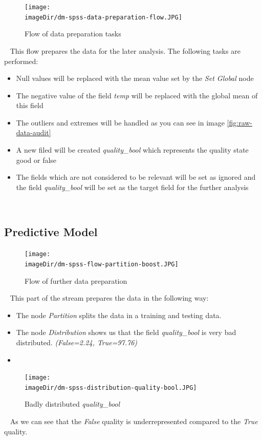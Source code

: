\documentclass[11pt, a4paper, twoside]{article}   	%
\newcommand{\imageDir}{./images/}
\begin{document}
\begin{figure}[h]
\centering
\texttt{[image: \\imageDir/dm-spss-data-preparation-flow.JPG]}
\caption{Flow of data preparation tasks}
\end{figure}
\ \newline
This flow prepares the data for the later analysis. The following tasks are performed:
\begin{itemize}
	\item Null values will be replaced with the mean value set by the \emph{Set Global} node
	\item The negative value of the field \emph{temp} will be replaced with the global mean of this field
	\item The outliers and extremes will be handled as you can see in image \ref{fig:raw-data-audit}
	\item A new filed will be created \emph{quality\_bool} which represents the quality state good or false
	\item The fields which are not considered to be relevant will be set as ignored and the field \emph{quality\_bool} will be set as the target field for the further analysis
\end{itemize}
\ \newpage

\subsection{Predictive Model}
\begin{figure}[h]
\centering
\texttt{[image: \\imageDir/dm-spss-flow-partition-boost.JPG]}
\caption{Flow of further data preparation}
\end{figure}
\ \newline
This part of the stream prepares the data in the following way:
\begin{itemize}
	\item The node \emph{Partition} splits the data in a training and testing data.
	\item The node \emph{Distribution} shows us that the field \emph{quality\_bool} is very bad distributed. \emph{(False=2.24, True=97.76)}
	\item 
\end{itemize}
\begin{figure}[h]
\centering
\texttt{[image: \\imageDir/dm-spss-distribution-quality-bool.JPG]}
\caption{Badly distributed \emph{quality\_bool}}
\end{figure}
\ \newline
As we can see that the \emph{False} quality is underrepresented compared to the \emph{True} quality.
\ \newpage
\end{document}
